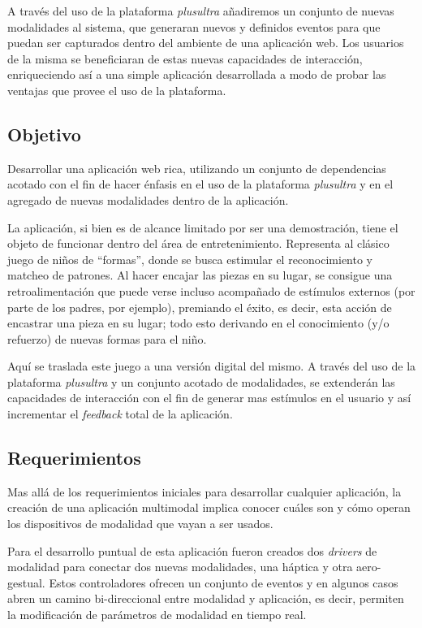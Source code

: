 A través del uso de la plataforma \emph{plusultra} añadiremos un conjunto de nuevas modalidades al sistema, que generaran nuevos y definidos eventos para que puedan ser capturados dentro del ambiente de una aplicación web. Los usuarios de la misma se beneficiaran de estas nuevas capacidades de interacción, enriqueciendo así a una simple aplicación desarrollada a modo de probar las ventajas que provee el uso de la plataforma.

\subsection{Objetivo}
Desarrollar una aplicación web rica, utilizando un conjunto de dependencias acotado con el fin de hacer énfasis en el uso de la plataforma \emph{plusultra} y en el agregado de nuevas modalidades dentro de la aplicación.

La aplicación, si bien es de alcance limitado por ser una demostración, tiene el objeto de funcionar dentro del área de entretenimiento. Representa al clásico juego de niños de ``formas'', donde se busca estimular el reconocimiento y matcheo de patrones. Al hacer encajar las piezas en su lugar, se consigue una retroalimentación que puede verse incluso acompañado de estímulos externos (por parte de los padres, por ejemplo), premiando el éxito, es decir, esta acción de encastrar una pieza en su lugar; todo esto derivando en el conocimiento (y/o refuerzo) de nuevas formas para el niño.

Aquí se traslada este juego a una versión digital del mismo. A través del uso de la plataforma \emph{plusultra} y un conjunto acotado de modalidades, se extenderán las capacidades de interacción con el fin de generar mas estímulos en el usuario y así incrementar el \emph{feedback} total de la aplicación. 

\subsection{Requerimientos}
Mas allá de los requerimientos iniciales para desarrollar cualquier aplicación, la creación de una aplicación multimodal implica conocer cuáles son y cómo operan los dispositivos de modalidad que vayan a ser usados. 

Para el desarrollo puntual de esta aplicación fueron creados dos \emph{drivers} de modalidad para conectar dos nuevas modalidades, una háptica y otra aero-gestual. 
Estos controladores ofrecen un conjunto de eventos y en algunos casos abren un camino bi-direccional entre modalidad y aplicación, es decir, permiten la modificación de parámetros de modalidad en tiempo real. 

